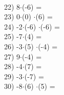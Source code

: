 \documentclass[a4paper,10pt]{article}
\begin{document}
\vspace{0.5cm}\\22)   8$\cdot$(-6) =
\vspace{0.5cm}\\23)   0$\cdot$(0) $\cdot$(6) =
\vspace{0.5cm}\\24)   -2$\cdot$(-6) $\cdot$(-6) =
\vspace{0.5cm}\\25)   -7$\cdot$(4) =
\vspace{0.5cm}\\26)   -3$\cdot$(5) $\cdot$(-4) =
\vspace{0.5cm}\\27)   9$\cdot$(-4) =
\vspace{0.5cm}\\28)   -4$\cdot$(7) =
\vspace{0.5cm}\\29)   -3$\cdot$(-7) =
\vspace{0.5cm}\\30)   -8$\cdot$(6) $\cdot$(5) =
\vspace{0.5cm}\\\pagebreak
\end{document}
